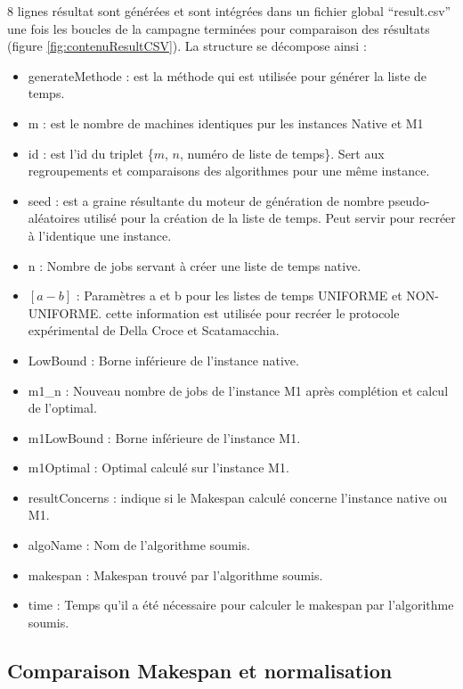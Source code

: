 \documentclass[a4paper,12pt]{report}
\theoremstyle{plain}				%
\theoremstyle{definition}				%
\begin{document}
8 lignes résultat sont générées et sont intégrées dans un fichier global ``result.csv'' une fois les boucles de la campagne terminées pour comparaison des résultats (figure \ref{fig:contenuResultCSV}). La structure se décompose ainsi :
\begin{itemize}
	\item generateMethode : est la méthode qui est utilisée pour générer la liste de temps. 
	\item m : est le nombre de machines identiques pur les instances Native et M1 
	\item id : est l'id du triplet \{$m$, $n$, numéro de liste de temps\}. 
			Sert aux regroupements et comparaisons des algorithmes pour une même instance.
	\item seed : est a graine résultante du moteur de génération de nombre pseudo-aléatoires 
			utilisé pour la création de la liste de temps. Peut servir pour recréer à 
			l'identique une instance. 
	\item n : Nombre de jobs servant à créer une liste de temps native. 
	\item $[a-b]$ : Paramètres a et b pour les listes de temps UNIFORME et NON-UNIFORME. 
			cette information est utilisée pour recréer le protocole expérimental 
			de Della Croce et Scatamacchia.
	\item LowBound : Borne inférieure de l'instance native.
	\item m1\_n : Nouveau nombre de jobs de l'instance M1 après complétion et calcul 
			de l'optimal.
	\item m1LowBound : Borne inférieure de l'instance M1.
	\item m1Optimal : Optimal calculé sur l'instance M1.
	\item resultConcerns : indique si le Makespan calculé concerne l'instance native ou M1.
	\item algoName : Nom de l'algorithme soumis.
	\item makespan : Makespan trouvé par l'algorithme soumis.
	\item time : Temps qu'il a été nécessaire pour calculer le makespan 
			par l’algorithme soumis. 
\end{itemize}

\subsection{Comparaison Makespan et normalisation}
 \label{ssec:campagnesComparaisonMakespanNormalisation}
\end{document}
